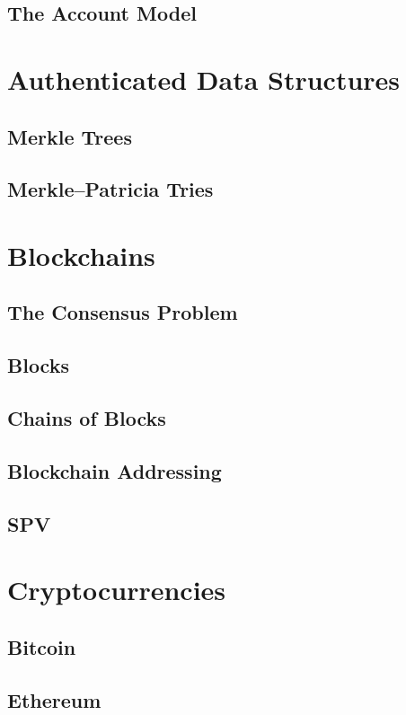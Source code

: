 \subsection{The Account Model}

\section{Authenticated Data Structures}
\subsection{Merkle Trees}
\subsection{Merkle–Patricia Tries}

\section{Blockchains}
\subsection{The Consensus Problem}
\subsection{Blocks}
\subsection{Chains of Blocks}
\subsection{Blockchain Addressing}
\subsection{SPV}

\section{Cryptocurrencies}
\subsection{Bitcoin}
\subsection{Ethereum}

